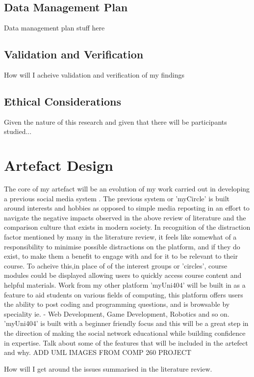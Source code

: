 \documentclass[lettersize,journal]{IEEEtran}
\begin{document}
	\subsection{Data Management Plan}
	Data management plan stuff here

	\subsection{Validation and Verification}
	How will I acheive validation and verification of my findings

	\subsection{Ethical Considerations}
	Given the nature of this research and given that there will be participants studied...
\section{Artefact Design}

	The core of my artefact will be an evolution of my work carried out in developing a previous social media system \cite{Daley 2022}.
	The previous system or 'myCircle' is built around interests and hobbies as opposed to simple media reposting in an effort to navigate the negative 
	impacts observed in the above review of literature and the comparison culture that exists in modern society.
	In recognition of the distraction factor mentioned by many in the literature review, it feels like somewhat of a responsibility to minimise possible distractions 
	on the platform, and if they do exist, to make them a benefit to engage with and for it to be relevant to their course.
	To acheive this,in place of of the interest groups or 'circles', course modules could be displayed allowing users to quickly access course content and helpful materials.
	Work from my other platform 'myUni404' will be built in as a feature to aid students on various fields of computing, this platform offers users the ability to post coding 
	and programming questions, and is browsable by speciality  ie. -  Web Development, Game Development, Robotics and so on. 'myUni404' is built with a beginner friendly focus 
	and this will be a great step in the direction of making the social network educational while building confidence in expertise.
	Talk about some of the features that will be included in the artefect and why.
	ADD UML IMAGES FROM COMP 260 PROJECT

	How will I get around the issues summarised in the literature review.
\end{document}
